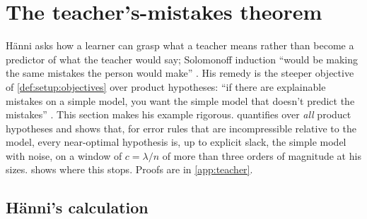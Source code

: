 \section{The teacher's-mistakes theorem}\label{sec:teacher}

H\"anni asks how a learner can grasp what a teacher means rather than become a predictor of what the teacher would say; Solomonoff induction ``would be making the same mistakes the person would make'' \citep{hanni2026notes}. His remedy is the steeper objective of \cref{def:setup:objectives} over product hypotheses: ``if there are explainable mistakes on a simple model, you want the simple model that doesn't predict the mistakes'' \citep{hanni2026notes}. This section makes his example rigorous.  quantifies over \emph{all} product hypotheses and shows that, for error rules that are incompressible relative to the model, every near-optimal hypothesis is, up to explicit slack, the simple model with noise, on a window of $c=\lambda/n$ of more than three orders of magnitude at his sizes.  shows where this stops. Proofs are in \cref{app:teacher}.

\subsection{H\"anni's calculation}\label{sec:teacher:hanni}

